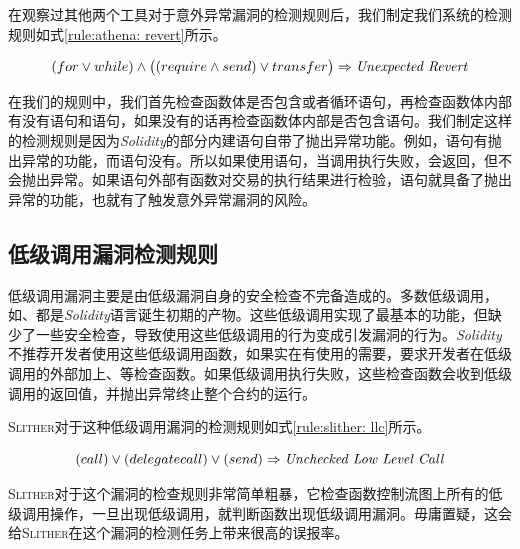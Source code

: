 在观察过其他两个工具对于意外异常漏洞的检测规则后，我们制定我们系统的检测规则如式\ref{rule:athena: revert}所示。
\begin{mdframed}[
	linewidth = 1pt,
	innertopmargin = -5pt,
	innerbottommargin = 3pt,
	outerlinewidth = 1pt
	]
    \small
	\begin{equation} \label{rule:athena: revert}
    (for \vee while) \wedge \big ((require \wedge send) \vee transfer \big )  \Rightarrow \text{\emph{Unexpected Revert}}
	\end{equation}
\end{mdframed}
在我们的规则中，我们首先检查函数体是否包含或者循环语句，再检查函数体内部有没有语句和语句，如果没有的话再检查函数体内部是否包含语句。我们制定这样的检测规则是因为\emph{Solidity}的部分内建语句自带了抛出异常功能。例如，语句有抛出异常的功能，而语句没有。所以如果使用语句，当调用执行失败，会返回，但不会抛出异常。如果语句外部有函数对交易的执行结果进行检验，语句就具备了抛出异常的功能，也就有了触发意外异常漏洞的风险。

\subsection{低级调用漏洞检测规则}
低级调用漏洞主要是由低级漏洞自身的安全检查不完备造成的。多数低级调用，如、都是\emph{Solidity}语言诞生初期的产物。这些低级调用实现了最基本的功能，但缺少了一些安全检查，导致使用这些低级调用的行为变成引发漏洞的行为。\emph{Solidity}不推荐开发者使用这些低级调用函数，如果实在有使用的需要，要求开发者在低级调用的外部加上、等检查函数。如果低级调用执行失败，这些检查函数会收到低级调用的返回值，并抛出异常终止整个合约的运行。

\textsc{Slither}对于这种低级调用漏洞的检测规则如式\ref{rule:slither: llc}所示。
\begin{mdframed}[
	linewidth = 1pt,
	innertopmargin = -5pt,
	innerbottommargin = 3pt,
	outerlinewidth = 1pt
	]
    \small
	\begin{equation} \label{rule:slither: llc}
    ( call) \vee (delegatecall) \vee (send) \Rightarrow \text{\emph{Unchecked Low Level Call}}
	\end{equation}
\end{mdframed}
\textsc{Slither}对于这个漏洞的检查规则非常简单粗暴，它检查函数控制流图上所有的低级调用操作，一旦出现低级调用，就判断函数出现低级调用漏洞。毋庸置疑，这会给\textsc{Slither}在这个漏洞的检测任务上带来很高的误报率。

